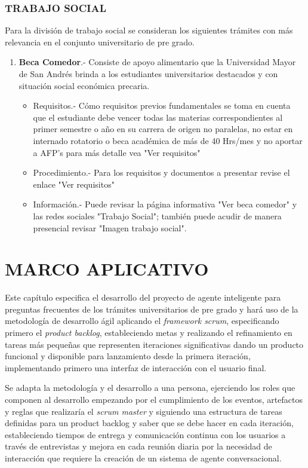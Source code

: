\documentclass[letter, openright, 12pt]{book}
\begin{document}
\begin{enumerate}[label=(\alph*)]
\subsection{TRABAJO SOCIAL}
Para la división de trabajo social se consideran los siguientes trámites con más relevancia en el conjunto universitario de pre grado.
\begin{enumerate}[label=(\alph*)]

\item \textbf{Beca Comedor}.- Consiste de apoyo alimentario que la Universidad Mayor de San Andrés brinda a los estudiantes universitarios destacados y con situación social económica precaria.
\begin{itemize}
\item Requisitos.- Cómo requisitos previos fundamentales se toma en cuenta que el estudiante debe vencer todas las materias correspondientes al primer semestre o año en su carrera de origen no paralelas, no estar en internado rotatorio o beca académica de más de 40 Hrs/mes y no aportar a AFP's para más detalle vea "Ver requisitos"
\item Procedimiento.- Para los requisitos y documentos a presentar revise el enlace "Ver requisitos"
\item Información.- Puede revisar la página informativa "Ver beca comedor" y las redes sociales "Trabajo Social"; también puede acudir de manera presencial revisar "Imagen trabajo social".
\end{itemize}
\end{enumerate}

\end{enumerate}


\chapter{MARCO APLICATIVO} 

Este capítulo especifica el desarrollo del proyecto de agente inteligente para preguntas frecuentes de los trámites universitarios de pre grado y hará uso de la metodología de desarrollo ágil aplicando el {\it framework scrum}, especificando primero el {\it product backlog}, estableciendo metas y realizando el refinamiento en tareas más pequeñas que representen iteraciones significativas dando un producto funcional y disponible para lanzamiento desde la primera iteración, implementando primero una interfaz de interacción con el usuario final. \par
Se adapta la metodología y el desarrollo a una persona, ejerciendo los roles que componen al desarrollo empezando por el cumplimiento de los eventos, artefactos y reglas que realizaría el {\it scrum master} y siguiendo una estructura de tareas definidas para un product backlog y saber que se debe hacer en cada iteración, estableciendo tiempos de entrega y comunicación continua con los usuarios a través de entrevistas y mejora en cada reunión diaria por la necesidad de interacción que requiere la creación de un sistema de agente conversacional. 
\end{document}
